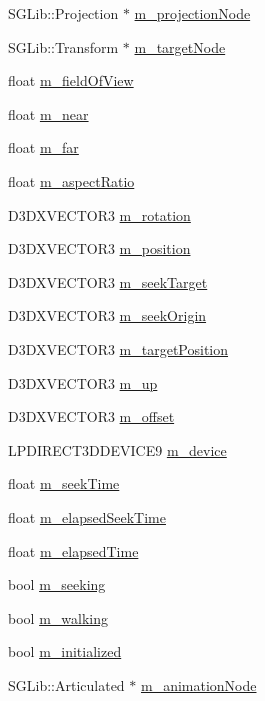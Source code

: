 \begin{DoxyCompactItemize}
\item 
SGLib::Projection $\ast$ \hyperlink{class_feisty_1_1_camera_a3197aef7f3d3387c491dff1fbcbed1a5}{m\_\-projectionNode}
\item 
SGLib::Transform $\ast$ \hyperlink{class_feisty_1_1_camera_ae903d3ca5f7b7a39409b5f93260540b0}{m\_\-targetNode}
\item 
float \hyperlink{class_feisty_1_1_camera_a31f25794fd365e6f470bfdef89db7fec}{m\_\-fieldOfView}
\item 
float \hyperlink{class_feisty_1_1_camera_a88a4135705f989e598056d765b7a3494}{m\_\-near}
\item 
float \hyperlink{class_feisty_1_1_camera_a244474dcfdd0115417b8218cbad547d1}{m\_\-far}
\item 
float \hyperlink{class_feisty_1_1_camera_a9a5b3abea53ca97854696258029ee6cd}{m\_\-aspectRatio}
\item 
D3DXVECTOR3 \hyperlink{class_feisty_1_1_camera_af3087fb07e6ef81121025dd39b3768c0}{m\_\-rotation}
\item 
D3DXVECTOR3 \hyperlink{class_feisty_1_1_camera_ac9f127b7de1e9a2a90d7e44cf76a10fc}{m\_\-position}
\item 
D3DXVECTOR3 \hyperlink{class_feisty_1_1_camera_a4d08c6d9f7ae87b91922fada6c71a970}{m\_\-seekTarget}
\item 
D3DXVECTOR3 \hyperlink{class_feisty_1_1_camera_a32129e76cfe6d76caa62dac33e629c08}{m\_\-seekOrigin}
\item 
D3DXVECTOR3 \hyperlink{class_feisty_1_1_camera_a46e0e07b73df0dac52e8dea78f8a931b}{m\_\-targetPosition}
\item 
D3DXVECTOR3 \hyperlink{class_feisty_1_1_camera_aa5b229f3392f3ad3f9863fdb4965288a}{m\_\-up}
\item 
D3DXVECTOR3 \hyperlink{class_feisty_1_1_camera_af6bf5ba87e84d43ec23d0cb9e4d0647b}{m\_\-offset}
\item 
LPDIRECT3DDEVICE9 \hyperlink{class_feisty_1_1_camera_a97f0d0c8495ae47a9cb68eb0250e6fec}{m\_\-device}
\item 
float \hyperlink{class_feisty_1_1_camera_a09faed9efdd9403c38b87314d6098720}{m\_\-seekTime}
\item 
float \hyperlink{class_feisty_1_1_camera_a6dfc75d25cfe092df8980d0182b05be0}{m\_\-elapsedSeekTime}
\item 
float \hyperlink{class_feisty_1_1_camera_a970eb963a54195b32a27a2e1cd9edd9b}{m\_\-elapsedTime}
\item 
bool \hyperlink{class_feisty_1_1_camera_a22a25da8dd1087d33d5835c8bcc13434}{m\_\-seeking}
\item 
bool \hyperlink{class_feisty_1_1_camera_aae8a222463783a5f5114ffbc6a22dc91}{m\_\-walking}
\item 
bool \hyperlink{class_feisty_1_1_camera_ab5e5bb6729ea8baa0a59c4465325b534}{m\_\-initialized}
\item 
SGLib::Articulated $\ast$ \hyperlink{class_feisty_1_1_camera_a3c97db1bade9711107fc3719fab4b9a7}{m\_\-animationNode}
\end{DoxyCompactItemize}



